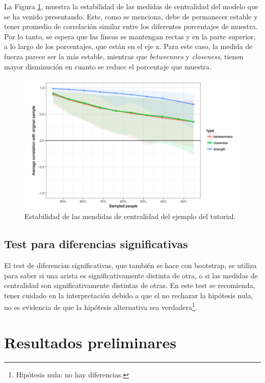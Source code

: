 \documentclass[11pt,spanish]{article}\usepackage[]{graphicx}\usepackage[]{color}
\begin{document}
La Figura \ref{fig:estabilidad_tutorial}, muestra la estabilidad de las medidas de centralidad del modelo que se ha venido presentando. Este, como se menciona, debe de permanecer estable y tener promedio de correlación similar entre los diferentes porcentajes de muestra. Por lo tanto, se espera que las líneas se mantengan rectas y en la parte superior, a lo largo de los porcentajes, que están en el eje x. Para este caso, la medida de fuerza parece ser la más estable, mientras que \emph{betweennes} y \emph{closeness}, tienen mayor disminución en cuanto se reduce el porcentaje que muestra. 

\begin{figure}[!ht]
\centering
\includegraphics[scale=0.5]{images/estabilidad_tutorial}
\caption{Estabilidad de las mendidas de centralidad del ejemplo del tutorial.}
\label{fig:estabilidad_tutorial}
\end{figure}

\subsection{Test para diferencias significativas}

El test de diferencias significativas, que también se hace con bootstrap, se utiliza para saber si una arista es significativamente distinta de otra, o si las medidas de centralidad son significativamente distintas de otras. En este test se recomienda, tener cuidado en la interpretación debido a que el no rechazar la hipótesis nula, no es evidencia de que la hipótesis alternativa sea verdadera\footnote{Hipótesis nula: no hay diferencias.}.

\newpage

\section{Resultados preliminares}
\end{document}
